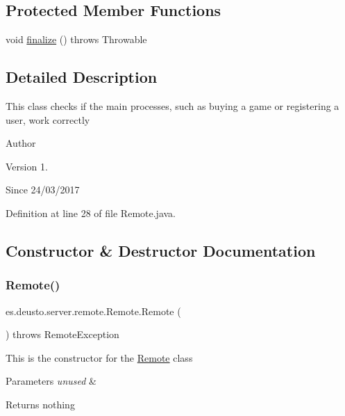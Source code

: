 \subsection*{Protected Member Functions}
\begin{DoxyCompactItemize}
\item 
void \hyperlink{classes_1_1deusto_1_1server_1_1remote_1_1_remote_ac8c5c24cdafa413da4ad7d71f7f710d3}{finalize} ()  throws Throwable 
\end{DoxyCompactItemize}


\subsection{Detailed Description}
This class checks if the main processes, such as buying a game or registering a user, work correctly \begin{DoxyAuthor}{Author}

\end{DoxyAuthor}
\begin{DoxyVersion}{Version}
1. 
\end{DoxyVersion}
\begin{DoxySince}{Since}
24/03/2017 
\end{DoxySince}


Definition at line 28 of file Remote.\+java.



\subsection{Constructor \& Destructor Documentation}
\mbox{\label{classes_1_1deusto_1_1server_1_1remote_1_1_remote_a39055ae30196c2afe97a621b80e43374}} 
\subsubsection{\texorpdfstring{Remote()}{Remote()}}
{\footnotesize\ttfamily es.\+deusto.\+server.\+remote.\+Remote.\+Remote (\begin{DoxyParamCaption}{ }\end{DoxyParamCaption}) throws Remote\+Exception}

This is the constructor for the \hyperlink{classes_1_1deusto_1_1server_1_1remote_1_1_remote}{Remote} class 
\begin{DoxyParams}{Parameters}
{\em unused} & \\
\hline
\end{DoxyParams}
\begin{DoxyReturn}{Returns}
nothing 
\end{DoxyReturn}


